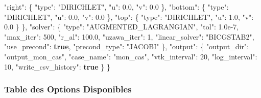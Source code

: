 \documentclass[
  french,
]{article}
\newenvironment{Shaded}{}{}
\newcommand{\DataTypeTok}[1]{\textcolor[rgb]{0.56,0.13,0.00}{#1}}
\newcommand{\DecValTok}[1]{\textcolor[rgb]{0.25,0.63,0.44}{#1}}
\newcommand{\FloatTok}[1]{\textcolor[rgb]{0.25,0.63,0.44}{#1}}
\newcommand{\FunctionTok}[1]{\textcolor[rgb]{0.02,0.16,0.49}{#1}}
\newcommand{\KeywordTok}[1]{\textcolor[rgb]{0.00,0.44,0.13}{\textbf{#1}}}
\newcommand{\StringTok}[1]{\textcolor[rgb]{0.25,0.44,0.63}{#1}}
\begin{document}
\begin{Shaded}
\begin{Highlighting}[]
    \DataTypeTok{"right"}\FunctionTok{:}  \FunctionTok{\{} \DataTypeTok{"type"}\FunctionTok{:} \StringTok{"DIRICHLET"}\FunctionTok{,} \DataTypeTok{"u"}\FunctionTok{:} \FloatTok{0.0}\FunctionTok{,} \DataTypeTok{"v"}\FunctionTok{:} \FloatTok{0.0} \FunctionTok{\},}
    \DataTypeTok{"bottom"}\FunctionTok{:} \FunctionTok{\{} \DataTypeTok{"type"}\FunctionTok{:} \StringTok{"DIRICHLET"}\FunctionTok{,} \DataTypeTok{"u"}\FunctionTok{:} \FloatTok{0.0}\FunctionTok{,} \DataTypeTok{"v"}\FunctionTok{:} \FloatTok{0.0} \FunctionTok{\},}
    \DataTypeTok{"top"}\FunctionTok{:}    \FunctionTok{\{} \DataTypeTok{"type"}\FunctionTok{:} \StringTok{"DIRICHLET"}\FunctionTok{,} \DataTypeTok{"u"}\FunctionTok{:} \FloatTok{1.0}\FunctionTok{,} \DataTypeTok{"v"}\FunctionTok{:} \FloatTok{0.0} \FunctionTok{\}}
  \FunctionTok{\},}
  \DataTypeTok{"solver"}\FunctionTok{:} \FunctionTok{\{}
    \DataTypeTok{"type"}\FunctionTok{:} \StringTok{"AUGMENTED\_LAGRANGIAN"}\FunctionTok{,}
    \DataTypeTok{"tol"}\FunctionTok{:} \FloatTok{1.0e{-}7}\FunctionTok{,}
    \DataTypeTok{"max\_iter"}\FunctionTok{:} \DecValTok{500}\FunctionTok{,}
    \DataTypeTok{"r\_al"}\FunctionTok{:} \FloatTok{100.0}\FunctionTok{,}
    \DataTypeTok{"uzawa\_iter"}\FunctionTok{:} \DecValTok{1}\FunctionTok{,}
    \DataTypeTok{"linear\_solver"}\FunctionTok{:} \StringTok{"BICGSTAB2"}\FunctionTok{,}
    \DataTypeTok{"use\_precond"}\FunctionTok{:} \KeywordTok{true}\FunctionTok{,}
    \DataTypeTok{"precond\_type"}\FunctionTok{:} \StringTok{"JACOBI"}
  \FunctionTok{\},}
  \DataTypeTok{"output"}\FunctionTok{:} \FunctionTok{\{}
    \DataTypeTok{"output\_dir"}\FunctionTok{:} \StringTok{"output\_mon\_cas"}\FunctionTok{,}
    \DataTypeTok{"case\_name"}\FunctionTok{:} \StringTok{"mon\_cas"}\FunctionTok{,}
    \DataTypeTok{"vtk\_interval"}\FunctionTok{:} \DecValTok{20}\FunctionTok{,}
    \DataTypeTok{"log\_interval"}\FunctionTok{:} \DecValTok{10}\FunctionTok{,}
    \DataTypeTok{"write\_csv\_history"}\FunctionTok{:} \KeywordTok{true}
  \FunctionTok{\}}
\FunctionTok{\}}
\end{Highlighting}
\end{Shaded}

\subsubsection{Table des Options
Disponibles}\label{table-des-options-disponibles}
\end{document}
